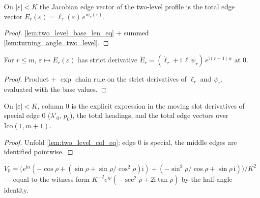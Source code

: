 \begin{lemma}
  \label{lem:jacobian_edge_two_level}
  On $|\varepsilon| < K$ the Jacobian edge vector of the two-level profile is
  the total edge vector
  $E_r(\varepsilon) = \ell_r(\varepsilon)\,e^{\mathrm{i}\psi_r(\varepsilon)}$.
\end{lemma}
\begin{proof}

\leanok
  \cref{lem:two_level_base_len_eq} + summed \cref{lem:turning_angle_two_level}.
\end{proof}

\begin{lemma}
  \label{lem:has_strict_deriv_at_two_level_edge}
  For $r \le m$, $\varepsilon \mapsto E_r(\varepsilon)$ has strict derivative
  $\dot E_r = (\dot\ell_r + \mathrm{i}\,\ell\,\dot\psi_r)\,
  e^{\mathrm{i}(r+1)\alpha}$ at $0$.
\end{lemma}
\begin{proof}

\leanok
  Product + $\exp$ chain rule on the strict derivatives of
  $\ell_r$ and $\psi_r$, evaluated with the base values.
\end{proof}

\begin{lemma}
  \label{lem:two_level_col_formula_zero}
  On $|\varepsilon| < K$, column $0$ is the explicit expression in the moving
  slot derivatives of special edge $0$ ($\lambda'_0$, $p_0$), the total
  headings, and the total edge vectors over $\mathrm{Ico}(1, m{+}1)$.
\end{lemma}
\begin{proof}

\leanok
  Unfold \cref{lem:two_level_col_eq}; edge $0$ is special, the middle edges
  are identified pointwise.
\end{proof}

\begin{definition}
  \label{def:two_level_v_zero}
  $V_0 = \bigl(e^{\mathrm{i}\alpha}(-\cos\rho + (\sin\rho +
  \sin\rho/\cos^2\rho)\mathrm{i}) + (-\sin^2\rho/\cos\rho +
  \sin\rho\,\mathrm{i})\bigr)/K^2$ --- equal to the witness form
  $K^{-2}e^{\mathrm{i}\rho}(-\sec^2\rho + 2\mathrm{i}\tan\rho)$ by the
  half-angle identity.
\end{definition}

